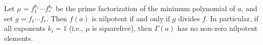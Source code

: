 Let $\mu = f_1^{k_1} \cdots f_r^{k_r}$ be the prime factorization of the minimum polynomial of $a$, and set $g = f_1 \cdots f_r$. Then $f(a)$ is nilpotent if and only if $g$ divides $f$. In particular, if all exponents $k_i = 1$ (i.e., $\mu$ is squarefree), then $\Gamma(a)$ has no non-zero nilpotent elements.
